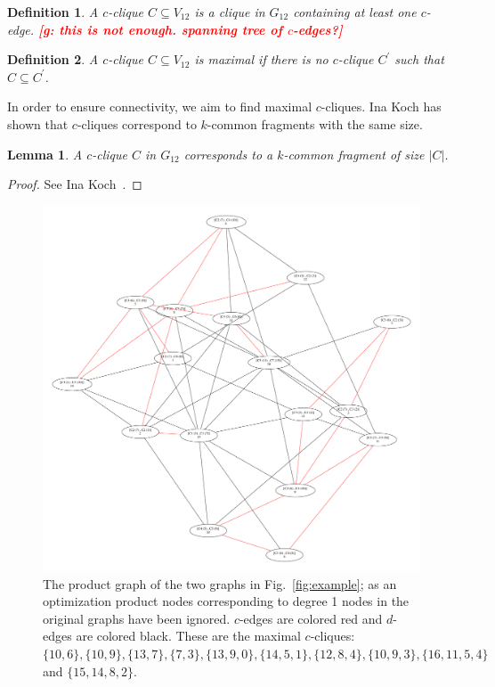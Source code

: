 \documentclass[11pt]{article}
\newcommand{\todo}[1]{\xspace{\bfseries\sffamily\textcolor{red}{[#1]}}\xspace}
\newtheorem{definition}{Definition}[section]
\newtheorem{lemma}[theorem]{Lemma}
\begin{document}
\begin{definition}
A \emph{$c$-clique} $C \subseteq V_{12}$ is a clique in $G_{12}$ containing at
least one $c$-edge. \todo{g: this is not enough. spanning tree of $c$-edges?}
\end{definition}

\begin{definition}
A $c$-clique $C \subseteq V_{12}$ is \emph{maximal} if there is no
$c$-clique $C^\prime$ such that $C \subseteq C^\prime$.
\end{definition}

In order to ensure connectivity, we aim to find maximal $c$-cliques. Ina Koch
has shown that $c$-cliques correspond to $k$-common fragments with the same size.

\begin{lemma}
A $c$-clique $C$ in $G_{12}$ corresponds to a $k$-common fragment of size $|C|$.
\end{lemma}
\begin{proof}
See Ina Koch~\cite{Koch:2001wi}.
\end{proof}

\begin{figure}
  \center
  \includegraphics[width=1.1\textwidth]{images/product}
  \caption{The product graph of the two graphs in Fig.~\ref{fig:example}; as an optimization product nodes corresponding to
    degree 1 nodes in the original graphs have been ignored. $c$-edges are
    colored red and $d$-edges are colored black. These are the maximal
    $c$-cliques: $\{10,6\}, \{10,9\}, \{13, 7\},
    \{7, 3\}, \{13, 9, 0\}, \{14, 5, 1\}, \{12, 8, 4\}, \{10, 9, 3\}, \{16, 11,
    5, 4\}$ and $\{15, 14, 8, 2\}$.}
  \label{fig:product}
\end{figure}
\end{document}
